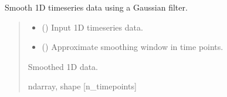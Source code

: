 \documentclass[letterpaper,10pt,english]{sphinxhowto}
\begin{document}
\begin{fulllineitems}
\label{\detokenize{stuff:neurora.stuff.smooth_1d_gaussian}}
\pysigstartsignatures
{}
\pysigstopsignatures
\sphinxAtStartPar
Smooth 1\sphinxhyphen{}D time\sphinxhyphen{}series data using a Gaussian filter.
\begin{quote}\begin{description}
\begin{itemize}
\item {} 
\sphinxAtStartPar
{} (\sphinxstyleliteralemphasis{\sphinxupquote{, }}\sphinxstyleliteralemphasis{\sphinxupquote{ {[}}}\sphinxstyleliteralemphasis{\sphinxupquote{{]}}}) \textendash{} Input 1\sphinxhyphen{}D time\sphinxhyphen{}series data.

\item {} 
\sphinxAtStartPar
{} (\sphinxstyleliteralemphasis{\sphinxupquote{, }}) \textendash{} Approximate smoothing window in time points.

\end{itemize}

\sphinxAtStartPar
{} \textendash{} Smoothed 1\sphinxhyphen{}D data.

\sphinxAtStartPar
ndarray, shape {[}n\_timepoints{]}

\end{description}\end{quote}

\end{fulllineitems}

\end{document}
